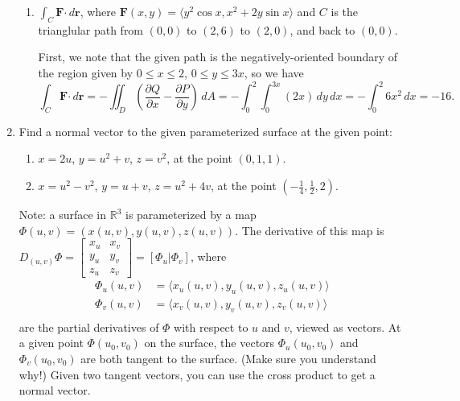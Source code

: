 \documentclass[letterpaper,12pt]{article}
\newcommand{\R}{\mathbb{R}}
\newcommand{\pd}[2]{\dfrac{\partial #1}{\partial #2}}
\renewcommand{\r}{\mathbf{r}}
\newcommand{\dotp}{\boldsymbol{\cdot}}
\newcommand{\F}{\mathbf{F}}
\begin{document}
\begin{enumerate}
\begin{enumerate}
 \item $\int_C \F\dotp \,d\r$, where $\F(x,y) = \langle y^2\cos x, x^2+2y\sin x\rangle$ and $C$ is the trianglular path from $(0,0)$ to $(2,6)$ to $(2,0)$, and back to $(0,0)$.

\bigskip

First, we note that the given path is the negatively-oriented boundary of the region given by $0\leq x\leq 2$, $0\leq y\leq 3x$, so we have
\[
 \int_C \F\dotp \,d\r = -\iint_D\left(\pd{Q}{x}-\pd{P}{y}\right)\,dA = -\int_0^2\int_0^{3x}(2x)\,dy\,dx = -\int_0^2 6x^2\,dx = -16.
\]

\end{enumerate}
 \item Find a normal vector to the given parameterized surface at the given point:
\begin{enumerate}
 \item $x=2u$, $y=u^2+v$, $z=v^2$, at the point $(0,1,1)$.
 \item $x=u^2-v^2$, $y=u+v$, $z=u^2+4v$, at the point $(-\frac{1}{4}, \frac{1}{2}, 2)$.
\end{enumerate}
Note: a surface in $\R^3$ is parameterized by a map $\Phi(u,v) = (x(u,v), y(u,v), z(u,v))$. The derivative of this map is $D_{(u,v)}\Phi = \begin{bmatrix} x_u & x_v\\y_u&y_v\\z_u&z_v\end{bmatrix} = [\Phi_u | \Phi_v]$, where 
\begin{align*}
 \Phi_u(u,v) &= \langle x_u(u,v), y_u(u,v), z_u(u,v)\rangle\\
 \Phi_v(u,v) &= \langle x_v(u,v), y_v(u,v), z_v(u,v)\rangle\\
\end{align*}
are the partial derivatives of $\Phi$ with respect to $u$ and $v$, viewed as vectors. At a given point $\Phi(u_0,v_0)$ on the surface, the vectors $\Phi_u(u_0,v_0)$ and $\Phi_v(u_0,v_0)$ are both tangent to the surface. (Make sure you understand why!) Given two tangent vectors, you can use the cross product to get a normal vector.


 \end{enumerate}
\end{document}
